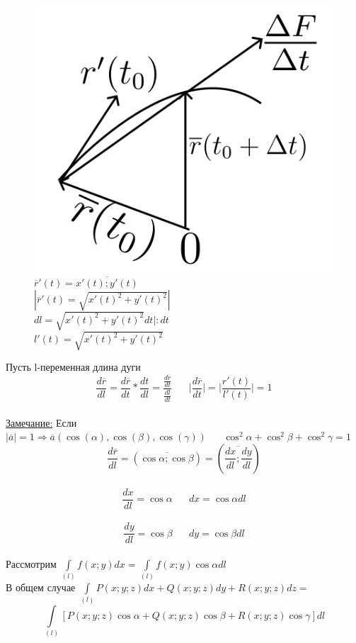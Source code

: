 \documentclass[12pt]{article}
\let\ORIincludegraphics\includegraphics
\renewcommand{\includegraphics}[2][]{\ORIincludegraphics[scale=0.65,#1]{#2}}
\let\oldint\int
\renewcommand{\int}{\oldint\limits}
\begin{document}
\begin{figure}[h!]
\begin{minipage}{0.45\textwidth}
        \includegraphics[width=\textwidth]{8.6.2.png} %
        \vspace{0.5em} %
        $\overline{r}'(t)=\overline{x'(t);y'(t)}$\\
        $|\overline{r}'(t)=\sqrt{x'(t)^2+y'(t)^2}|$\\
        $dl=\sqrt{x'(t)^2+y'(t)^2}dt|:dt$\\
        $l'(t)=\sqrt{x'(t)^2+y'(t)^2}$
    \end{minipage}
  \end{figure}
  \par
  Пусть l-переменная длина дуги\\
  \[\frac{d \overline{r}}{dl} = \frac{d \overline{r}}{dt}* \frac{dt}{dl}=\frac{\frac{d \overline{r}}{dt}}{\frac{dl}{dt}}
  \hspace{20pt} \Big| \frac{d \overline{r}}{dt} \Big| = \Big| \frac{r'(t)}{l'(t)} \Big| = 1\]\\
  \underline{Замечание:} Если $|\overline{a}|=1 \Rightarrow \overline{a}(\cos(\alpha),\cos(\beta),\cos(\gamma))
  \hspace{20pt} \cos^2 \alpha+\cos^2 \beta+\cos^2 \gamma=1$\\
  \[\frac{d \overline{r}}{dl}=(\overline{\cos \alpha; \cos \beta})=(\overline{\frac{dx}{dl};\frac{dy}{dl}})\]\\
  \[\frac{dx}{dl}=\cos \alpha \hspace{20pt} dx=\cos \alpha dl\]\\
  \[\frac{dy}{dl}=\cos \beta \hspace{20pt} dy=\cos \beta dl\]\\
  Рассмотрим $\int_{(l)}f(x;y)dx=\int_{(l)}f(x;y)\cos \alpha dl$\\
  В общем случае $\int_{(l)}P(x;y;z)dx+Q(x;y;z)dy+R(x;y;z)dz=$\\
  \[\int_{(l)} [P(x;y;z)\cos \alpha + Q(x;y;z)\cos \beta + R(x;y;z)\cos \gamma]dl\]\\
\end{document}
